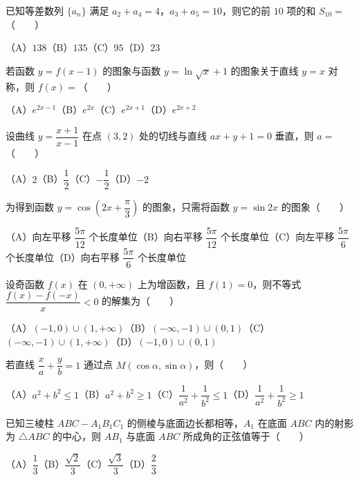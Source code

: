 \begin{question}
已知等差数列 $\{a_n\}$ 满足 $a_2+a_4=4$，$a_3+a_5=10$，则它的前 $10$ 项的和 $S_{10}=$\mbox{（　　）}

（A）$138$\quad（B）$135$\quad（C）$95$\quad（D）$23$

\end{question}
\begin{question}
若函数 $y=f(x-1)$ 的图象与函数 $y=\ln\sqrt{x}+1$ 的图象关于直线 $y=x$ 对称，则 $f(x)=$\mbox{（　　）}

（A）$e^{2x-1}$\quad（B）$e^{2x}$\quad（C）$e^{2x+1}$\quad（D）$e^{2x+2}$

\end{question}
\begin{question}
设曲线 $y=\dfrac{x+1}{x-1}$ 在点 $(3,2)$ 处的切线与直线 $ax+y+1=0$ 垂直，则 $a=$\mbox{（　　）}

（A）$2$\quad（B）$\dfrac12$\quad（C）$-\dfrac12$\quad（D）$-2$

\end{question}
\begin{question}
为得到函数 $y=\cos\left(2x+\dfrac\pi3\right)$ 的图象，只需将函数 $y=\sin2x$ 的图象\mbox{（　　）}

（A）向左平移 $\dfrac{5\pi}{12}$ 个长度单位\quad（B）向右平移 $\dfrac{5\pi}{12}$ 个长度单位\quad（C）向左平移 $\dfrac{5\pi}{6}$ 个长度单位\quad（D）向右平移 $\dfrac{5\pi}{6}$ 个长度单位

\end{question}
\begin{question}
设奇函数 $f(x)$ 在 $(0,+\infty)$ 上为增函数，且 $f(1)=0$，则不等式 $\dfrac{f(x)-f(-x)}{x}<0$ 的解集为\mbox{（　　）}

（A）$(-1,0)\cup(1,+\infty)$\quad（B）$(-\infty,-1)\cup(0,1)$\quad（C）$(-\infty,-1)\cup(1,+\infty)$\quad（D）$(-1,0)\cup(0,1)$

\end{question}
\begin{question}
若直线 $\dfrac{x}{a}+\dfrac{y}{b}=1$ 通过点 $M(\cos\alpha,\sin\alpha)$，则\mbox{（　　）}

（A）$a^2+b^2\leqslant1$\quad（B）$a^2+b^2\geqslant1$\quad（C）$\dfrac1{a^2}+\dfrac1{b^2}\leqslant1$\quad（D）$\dfrac1{a^2}+\dfrac1{b^2}\geqslant1$

\end{question}
\begin{question}
已知三棱柱 $ABC-A_1B_1C_1$ 的侧棱与底面边长都相等，$A_1$ 在底面 $ABC$ 内的射影为 $\triangle ABC$ 的中心，则 $AB_1$ 与底面 $ABC$ 所成角的正弦值等于\mbox{（　　）}

（A）$\dfrac13$\quad（B）$\dfrac{\sqrt2}{3}$\quad（C）$\dfrac{\sqrt3}{3}$\quad（D）$\dfrac23$

\Needspace{0.4\textheight}
\end{question}

